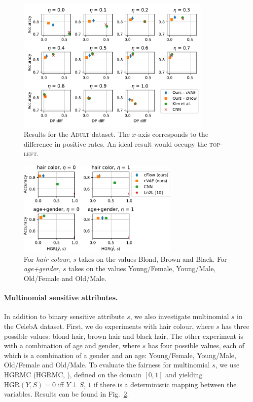 \begin{figure}[htb]
  \centering
  \includegraphics[width=0.85\textwidth]{nifr/Figures/nosinn_adult_multiplot_all_landscape_diff.pdf}
  \caption{
      Results for the \textsc{Adult} dataset.
      The $x$-axis corresponds to the difference in positive rates.
      An ideal result would occupy the \textsc{top-left}.
  }%
  \label{fig:big-adult-chart}
\end{figure}
\begin{figure}[htb]
    \centering
    \includegraphics[width=0.7\textwidth]{nifr/Figures/celeba_multi_s.pdf}
    \caption{
        For \emph{hair colour}, $s$ takes on the values Blond, Brown and Black. For
        \emph{age+gender}, $s$ takes on the values Young/Female, Young/Male, Old/Female and
        Old/Male.
    }%
    \label{fig:multi-s}
\end{figure}
%
\paragraph{Multinomial sensitive attributes.}
%
In addition to binary sensitive attribute $s$, we also investigate multinomial $s$ in the CelebA
dataset. 
%
First, we do experiments with hair colour, where $s$ has three possible values: blond hair, brown
hair and black hair. 
%
The other experiment is with a combination of age and gender, where $s$ has four possible values,
each of which is a combination of a gender and an age: Young/Female, Young/Male, Old/Female and
Old/Male. 
%
To evaluate the fairness for multinomial $s$, we use \acl{HGRMC} (\acs{HGRMC},
\citep{mary2019fairness}), defined on the domain $[0, 1]$ and yielding \( \text{HGR}(Y,S)=0 \) iff
$Y \perp S$, \(1\) if there is a deterministic mapping between the variables. 
%
Results can be found in Fig.~\ref{fig:multi-s}.\\

